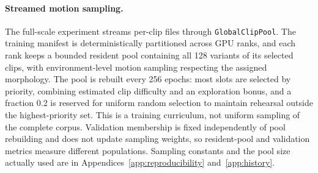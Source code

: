 \paragraph{Streamed motion sampling.}
The full-scale experiment streams per-clip files through
\texttt{GlobalClipPool}. The training manifest is deterministically partitioned
across GPU ranks, and each rank keeps a bounded resident pool containing all 128
variants of its selected clips, with environment-level motion sampling
respecting the assigned morphology. The pool is rebuilt every 256 epochs: most
slots are selected by priority, combining estimated clip difficulty and an
exploration bonus, and a fraction 0.2 is reserved for uniform random selection
to maintain rehearsal outside the highest-priority set. This is a training
curriculum, not uniform sampling of the complete corpus. Validation membership
is fixed independently of pool rebuilding and does not update sampling weights,
so resident-pool and validation metrics measure different populations. Sampling
constants and the pool size actually used are in
Appendices~\ref{app:reproducibility} and~\ref{app:history}.
